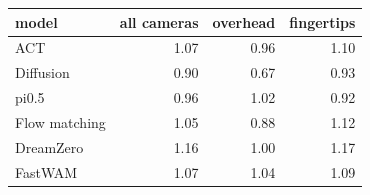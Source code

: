 \begin{tabular}{lrrr}
\toprule
model & all cameras & overhead & fingertips \\
\midrule
ACT & 1.07 & 0.96 & 1.10 \\
Diffusion & 0.90 & 0.67 & 0.93 \\
pi0.5 & 0.96 & 1.02 & 0.92 \\
Flow matching & 1.05 & 0.88 & 1.12 \\
DreamZero & 1.16 & 1.00 & 1.17 \\
FastWAM & 1.07 & 1.04 & 1.09 \\
\bottomrule
\end{tabular}
